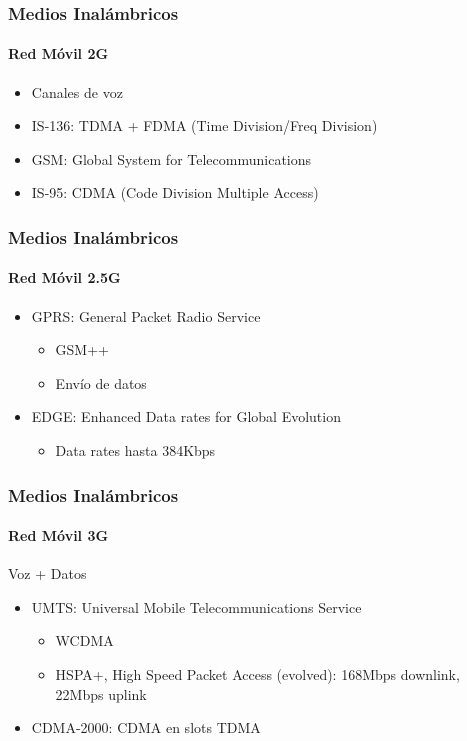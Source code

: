 \documentclass[letter]{beamer}
\begin{document}
\begin{frame}
  \frametitle{Medios Inalámbricos}
  \framesubtitle{Red Móvil 2G}

  \begin{itemize}
    \item Canales de voz
    \item IS-136: TDMA + FDMA (Time Division/Freq Division)
    \item GSM: Global System for Telecommunications
    \item IS-95: CDMA (Code Division Multiple Access)
  \end{itemize}
  
\end{frame}
\begin{frame}
  \frametitle{Medios Inalámbricos}
  \framesubtitle{Red Móvil 2.5G}

  \begin{itemize}
    \item GPRS: General Packet Radio Service
      \begin{itemize}
        \item GSM++
        \item Envío de datos
      \end{itemize}
    \item EDGE: Enhanced Data rates for Global Evolution
      \begin{itemize}
        \item Data rates hasta 384Kbps
      \end{itemize}
  \end{itemize}
  

\end{frame}

\begin{frame}
  \frametitle{Medios Inalámbricos}
  \framesubtitle{Red Móvil 3G}

  Voz + Datos
  
  \begin{itemize}
    \item UMTS: Universal Mobile Telecommunications Service
      \begin{itemize}
        \item WCDMA
        \item HSPA+, High Speed Packet Access (evolved): 168Mbps downlink, 22Mbps uplink
      \end{itemize}
    \item CDMA-2000: CDMA en slots TDMA
  \end{itemize}

\end{frame}
\end{document}

